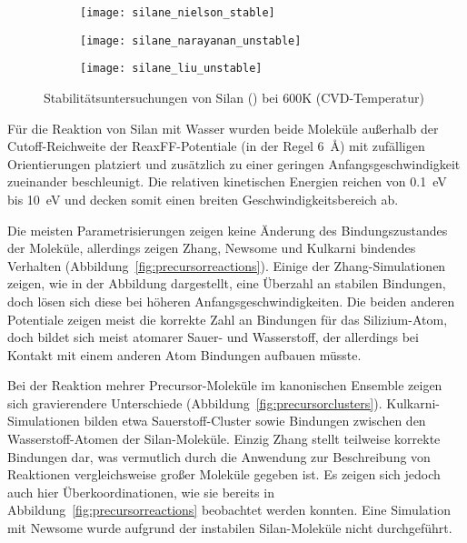\begin{figure}[!ht]

  \captionsetup[subfigure]{singlelinecheck=false}
  \def\subfigwidth{0.32\textwidth}
  \begin{subfigure}[t]{3.5cm}
    \texttt{[image: silane\_nielson\_stable]}
  \end{subfigure}
  \hfill
  \begin{subfigure}[t]{4.5cm}
    \texttt{[image: silane\_narayanan\_unstable]}
  \end{subfigure}
  \hfill
  \begin{subfigure}[t]{5cm}
    \texttt{[image: silane\_liu\_unstable]}
  \end{subfigure}

  \caption[Stabilitätsuntersuchungen von Silan]{
    Stabilitätsuntersuchungen von Silan () bei 600K (CVD-Temperatur)
  }
  \label{fig:silanestability}

\end{figure}

Für die Reaktion von Silan mit Wasser wurden beide Moleküle außerhalb der Cutoff-Reich\-weite der ReaxFF-Potentiale (in der Regel \SI{6}{\angstrom}) mit zufälligen Orientierungen platziert und zusätzlich zu einer geringen Anfangsgeschwindigkeit zueinander beschleunigt.
Die relativen kinetischen Energien reichen von \SI{0.1}{\electronvolt} bis \SI{10}{\electronvolt} und decken somit einen breiten Geschwindigkeitsbereich ab.

Die meisten Parametrisierungen zeigen keine Änderung des Bindungszustandes der Moleküle, allerdings zeigen Zhang, Newsome und Kulkarni bindendes Verhalten (Abbildung~\ref{fig:precursorreactions}).
Einige der Zhang-Simulationen zeigen, wie in der Abbildung dargestellt, eine Überzahl an stabilen Bindungen, doch lösen sich diese bei höheren Anfangsgeschwindigkeiten.
Die beiden anderen Potentiale zeigen meist die korrekte Zahl an Bindungen für das Silizium-Atom, doch bildet sich meist atomarer Sauer- und Wasserstoff, der allerdings bei Kontakt mit einem anderen Atom Bindungen aufbauen müsste.

Bei der Reaktion mehrer Precursor-Moleküle im kanonischen Ensemble zeigen sich gravierendere Unterschiede (Abbildung~\ref{fig:precursorclusters}).
Kulkarni-Simulationen bilden etwa Sauerstoff-Cluster sowie Bindungen zwischen den Wasserstoff-Atomen der Silan-Moleküle.
Einzig Zhang stellt teilweise korrekte Bindungen dar, was vermutlich durch die Anwendung zur Beschreibung von Reaktionen vergleichsweise großer Moleküle gegeben ist.
Es zeigen sich jedoch auch hier Überkoordinationen, wie sie bereits in Abbildung~\ref{fig:precursorreactions} beobachtet werden konnten.
Eine Simulation mit Newsome wurde aufgrund der instabilen Silan-Moleküle nicht durchgeführt.

